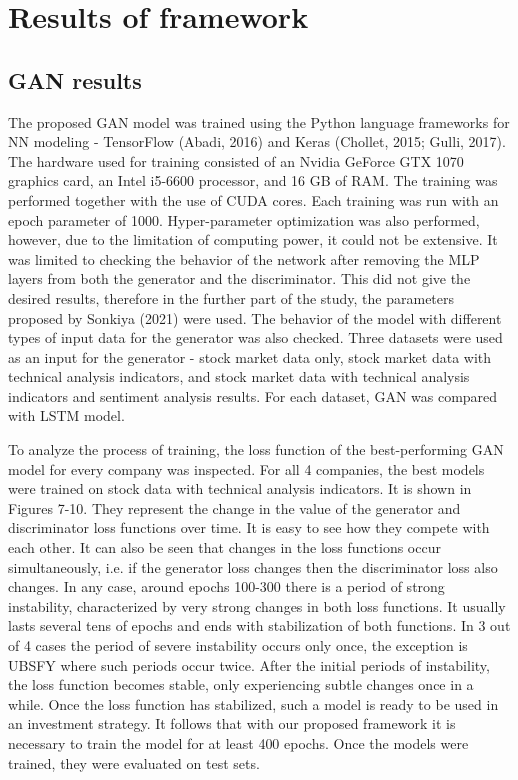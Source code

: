 \documentclass[review]{elsarticle} %
\begin{document}
\section{Results of framework}

\subsection{GAN results}

The proposed GAN model was trained using the Python language frameworks for NN modeling - TensorFlow (Abadi, 2016) and Keras (Chollet, 2015; Gulli, 2017). The hardware used for training consisted of an Nvidia GeForce GTX 1070 graphics card, an Intel i5-6600 processor, and 16 GB of RAM. The training was performed together with the use of CUDA cores. Each training was run with an epoch parameter of 1000. Hyper-parameter optimization was also performed, however, due to the limitation of computing power, it could not be extensive. It was limited to checking the behavior of the network after removing the MLP layers from both the generator and the discriminator. This did not give the desired results, therefore in the further part of the study, the parameters proposed by Sonkiya (2021) were used. The behavior of the model with different types of input data for the generator was also checked. Three datasets were used as an input for the generator - stock market data only, stock market data with technical analysis indicators, and stock market data with technical analysis indicators and sentiment analysis results. For each dataset, GAN was compared with LSTM model.

To analyze the process of training, the loss function of the best-performing GAN model for every company was inspected. For all 4 companies, the best models were trained on stock data with technical analysis indicators. It is shown in Figures 7-10. They represent the change in the value of the generator and discriminator loss functions over time. It is easy to see how they compete with each other. It can also be seen that changes in the loss functions occur simultaneously, i.e. if the generator loss changes then the discriminator loss also changes. In any case, around epochs 100-300 there is a period of strong instability, characterized by very strong changes in both loss functions. It usually lasts several tens of epochs and ends with stabilization of both functions. In 3 out of 4 cases the period of severe instability occurs only once, the exception is UBSFY where such periods occur twice. After the initial periods of instability, the loss function becomes stable, only experiencing subtle changes once in a while. Once the loss function has stabilized, such a model is ready to be used in an investment strategy. It follows that with our proposed framework it is necessary to train the model for at least 400 epochs. Once the models were trained, they were evaluated on test sets. 
\end{document}
